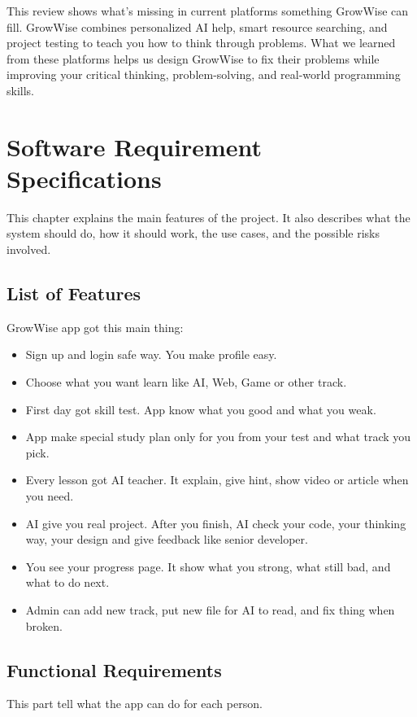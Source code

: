 \documentclass{FastFyp}
\begin{document}
This review shows what's missing in current platforms  something GrowWise can fill. GrowWise combines personalized AI help, smart resource searching, and project testing to teach you how to think through problems. What we learned from these platforms helps us design GrowWise to fix their problems while improving your critical thinking, problem-solving, and real-world programming skills.
\chapter{Software Requirement Specifications}
This chapter explains the main features of the project. It also describes what the system should do, how it should work, the use cases, and the possible risks involved.

\section{List of Features}

GrowWise app got this main thing:

\begin{itemize}
    \item Sign up and login safe way. You make profile easy.
    \item Choose what you want learn like AI, Web, Game or other track.
    \item First day got skill test. App know what you good and what you weak.
    \item App make special study plan only for you from your test and what track you pick.
    \item Every lesson got AI teacher. It explain, give hint, show video or article when you need.
    \item AI give you real project. After you finish, AI check your code, your thinking way, your design and give feedback like senior developer.
    \item You see your progress page. It show what you strong, what still bad, and what to do next.
    \item Admin can add new track, put new file for AI to read, and fix thing when broken.
\end{itemize}


\section{Functional Requirements}

This part tell what the app can do for each person.
\end{document}
